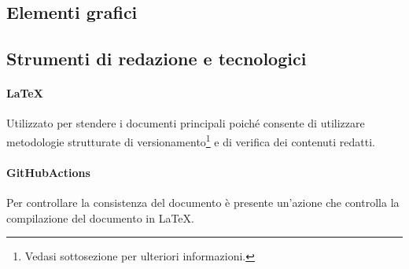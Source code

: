 \subsection{Elementi grafici}
\subsection{Strumenti di redazione e tecnologici}

\paragraph{\LaTeX} Utilizzato per stendere i documenti principali poiché consente di utilizzare metodologie strutturate di versionamento\footnote{Vedasi sottosezione  per ulteriori informazioni.} e di verifica dei contenuti redatti.

\paragraph{GitHubActions} Per controllare la consistenza del documento è presente un'azione che controlla la compilazione del documento in \LaTeX.
